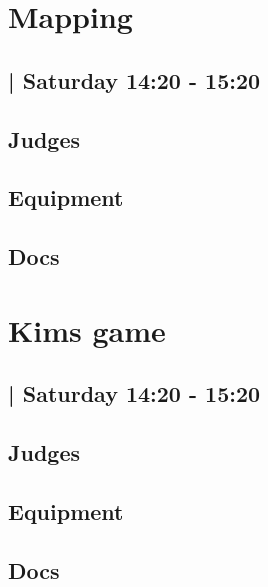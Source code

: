 \documentclass[10pt]{article}
\begin{document}
		\begin{minipage}{\linewidth}
		\setcounter{section}{44}
	\section{Mapping }
	\subsection*{ | Saturday 14:20 - 15:20}

	

	\begin{multicols}{2}
	\subsection*{\faUsers \: Judges}
	\begin{itemize}
		\end{itemize}
	\columnbreak
	\subsection*{\faWrench \: Equipment}
	        \vfill\null
        \subsection*{\faFile \: Docs}
     	\end{multicols}


	\vspace{1cm}
	\end{minipage}

		\begin{minipage}{\linewidth}
		\setcounter{section}{45}
	\section{Kims game }
	\subsection*{ | Saturday 14:20 - 15:20}

	

	\begin{multicols}{2}
	\subsection*{\faUsers \: Judges}
	\begin{itemize}
		\end{itemize}
	\columnbreak
	\subsection*{\faWrench \: Equipment}
	        \vfill\null
        \subsection*{\faFile \: Docs}
     	\end{multicols}


	\vspace{1cm}
	\end{minipage}
\end{document}
